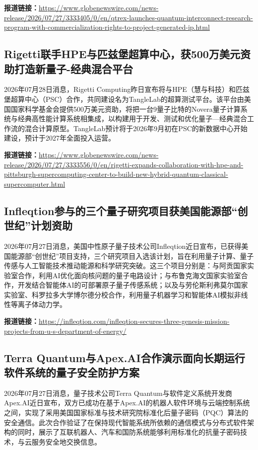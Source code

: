 \documentclass[12pt,a4paper]{ctexart}
\begin{document}
\noindent\textbf{报道链接：}\url{https://www.globenewswire.com/news-release/2026/07/27/3333405/0/en/qtrex-launches-quantum-interconnect-research-program-with-commercialization-rights-to-project-generated-ip.html}

\subsection{ Rigetti联手HPE与匹兹堡超算中心，获500万美元资助打造新量子-经典混合平台 }

2026年07月28日消息，Rigetti Computing昨日宣布将与HPE（慧与科技）和匹兹堡超算中心（PSC）合作，共同建设名为TangleLab的超算测试平台。该平台由美国国家科学基金会提供500万美元资助，将把一台9量子比特的Novera量子计算系统与经典高性能计算系统相集成，以构建用于开发、测试和优化量子—经典混合工作流的混合计算原型。TangleLab预计将于2026年9月初在PSC的新数据中心开始建设，预计于2027年全面投入运营。

\noindent\textbf{报道链接：}\url{https://www.globenewswire.com/news-release/2026/07/27/3333556/0/en/rigetti-expands-collaboration-with-hpe-and-pittsburgh-supercomputing-center-to-build-new-hybrid-quantum-classical-supercomputer.html}

\subsection{ Infleqtion参与的三个量子研究项目获美国能源部“创世纪”计划资助 }

2026年07月27日消息，美国中性原子量子技术公司Infleqtion近日宣布，已获得美国能源部“创世纪”项目支持，三个研究项目入选该计划，旨在利用量子计算、量子传感与人工智能技术推动能源和科学研究突破。这三个项目分别是：与阿贡国家实验室合作，利用AI优化面向核问题的量子电路设计；与布鲁克海文国家实验室合作，开发结合智能体AI的可部署原子量子传感系统；以及与劳伦斯利弗莫尔国家实验室、科罗拉多大学博尔德分校合作，利用量子机器学习和智能体AI模拟非线性等离子体动力学。

\noindent\textbf{报道链接：}\url{https://infleqtion.com/infleqtion-secures-three-genesis-mission-projects-from-u-s-department-of-energy/}

\subsection{ Terra Quantum与Apex.AI合作演示面向长期运行软件系统的量子安全防护方案 }

2026年07月27日消息，量子技术公司Terra Quantum与软件定义系统开发商Apex.AI近日宣布，双方已成功在基于Apex.AI的机器人软件环境与云端控制系统之间，实现了采用美国国家标准与技术研究院标准化后量子密码（PQC）算法的安全通信。此次合作验证了在保持现代智能系统所依赖的通信模式与分布式软件架构的同时，展示了互联机器人、汽车和国防系统能够利用标准化的抗量子密码技术，与云服务安全地交换信息。
\end{document}
